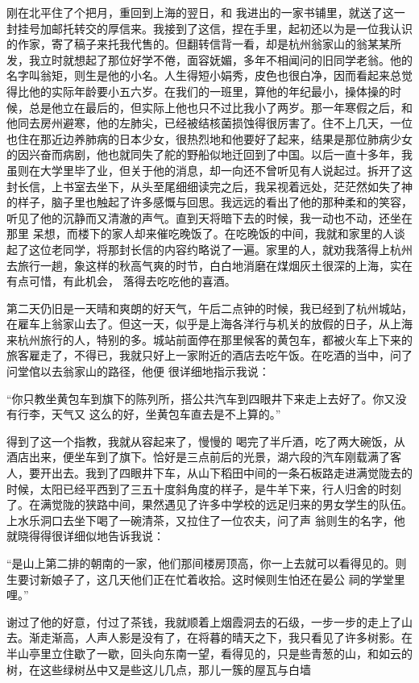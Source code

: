\documentclass{article}
\begin{document}
刚在北平住了个把月，重回到上海的翌日，和
\newpage
我进出的一家书铺里，就送了这一封挂号加邮托转交的厚信来。我接到了这信，捏在手里，起初还以为是一位我认识的作家，寄了稿子来托我代售的。但翻转信背一看，却是杭州翁家山的翁某某所发，我立时就想起了那位好学不倦，面容妩媚，多年不相闻问的旧同学老翁。他的名字叫翁矩，则生是他的小名。人生得短小娟秀，皮色也很白净，因而看起来总觉得比他的实际年龄要小五六岁。在我们的一班里，算他的年纪最小，操体操的时候，总是他立在最后的，但实际上他也只不过比我小了两岁。那一年寒假之后，和他同去房州避寒，他的左肺尖，已经被结核菌损蚀得很厉害了。住不上几天，一位也住在那近边养肺病的日本少女，很热烈地和他要好了起来，结果是那位肺病少女的因兴奋而病剧，他也就同失了舵的野船似地迁回到了中国。以后一直十多年，我虽则在大学里毕了业，但关于他的消息，却一向还不曾听见有人说起过。拆开了这封长信，上书室去坐下，从头至尾细细读完之后，我呆视着远处，茫茫然如失了神的样子，脑子里也触起了许多感慨与回思。我远远的看出了他的那种柔和的笑容，听见了他的沉静而又清澈的声气。直到天将暗下去的时候，我一动也不动，还坐在那里
\newpage
呆想，而楼下的家人却来催吃晚饭了。在吃晚饭的中间，我就和家里的人谈起了这位老同学，将那封长信的内容约略说了一遍。家里的人，就劝我落得上杭州去旅行一趟，象这样的秋高气爽的时节，白白地消磨在煤烟灰土很深的上海，实在有点可惜，有此机会，
落得去吃吃他的喜酒。 

第二天仍旧是一天晴和爽朗的好天气，午后二点钟的时候，我已经到了杭州城站，在雇车上翁家山去了。但这一天，似乎是上海各洋行与机关的放假的日子，从上海来杭州旅行的人，特别的多。城站前面停在那里候客的黄包车，都被火车上下来的旅客雇走了，不得已，我就只好上一家附近的酒店去吃午饭。在吃酒的当中，问了问堂倌以去翁家山的路径，他便
很详细地指示我说： 

“你只教坐黄包车到旗下的陈列所，搭公共汽车到四眼井下来走上去好了。你又没有行李，天气又
这么的好，坐黄包车直去是不上算的。” 

得到了这一个指教，我就从容起来了，慢慢的
\newpage
喝完了半斤酒，吃了两大碗饭，从酒店出来，便坐车到了旗下。恰好是三点前后的光景，湖六段的汽车刚载满了客人，要开出去。我到了四眼井下车，从山下稻田中间的一条石板路走进满觉陇去的时候，太阳已经平西到了三五十度斜角度的样子，是牛羊下来，行人归舍的时刻了。在满觉陇的狭路中间，果然遇见了许多中学校的远足归来的男女学生的队伍。上水乐洞口去坐下喝了一碗清茶，又拉住了一位农夫，问了声
翁则生的名字，他就晓得得很详细似地告诉我说： 

“是山上第二排的朝南的一家，他们那间楼房顶高，你一上去就可以看得见的。则生要讨新娘子了，这几天他们正在忙着收拾。这时候则生怕还在晏公
祠的学堂里哩。” 

谢过了他的好意，付过了茶钱，我就顺着上烟霞洞去的石级，一步一步的走上了山去。渐走渐高，人声人影是没有了，在将暮的晴天之下，我只看见了许多树影。在半山亭里立住歇了一歇，回头向东南一望，看得见的，只是些青葱的山，和如云的树，在这些绿树丛中又是些这儿几点，那儿一簇的屋瓦与白墙
\newpage
\end{document}
